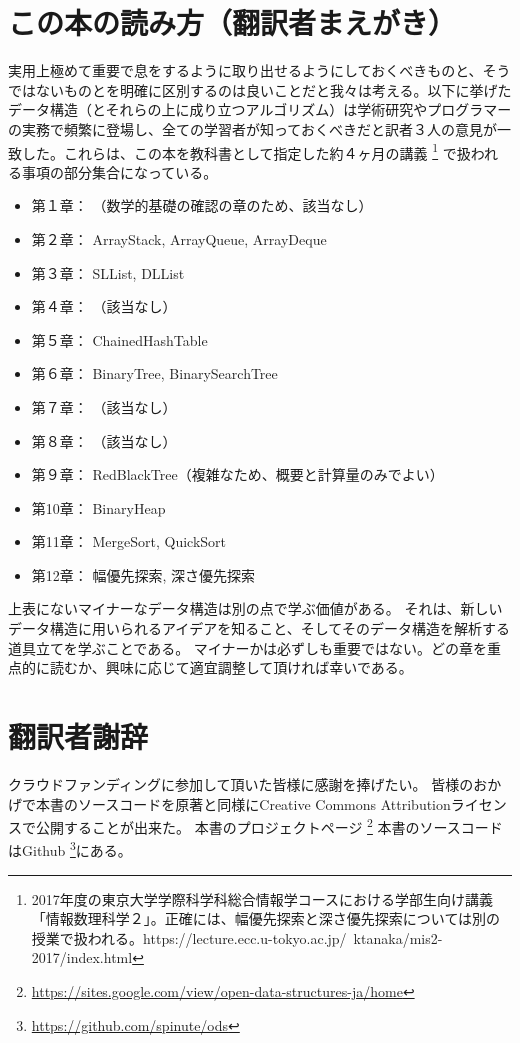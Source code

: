 \chapter*{この本の読み方（翻訳者まえがき）}

実用上極めて重要で息をするように取り出せるようにしておくべきものと、そうではないものとを明確に区別するのは良いことだと我々は考える。以下に挙げたデータ構造（とそれらの上に成り立つアルゴリズム）は学術研究やプログラマーの実務で頻繁に登場し、全ての学習者が知っておくべきだと訳者３人の意見が一致した。これらは、この本を教科書として指定した約４ヶ月の講義
\footnote{2017年度の東京大学学際科学科総合情報学コースにおける学部生向け講義「情報数理科学２」。正確には、幅優先探索と深さ優先探索については別の授業で扱われる。https://lecture.ecc.u-tokyo.ac.jp/~ktanaka/mis2-2017/index.html}
で扱われる事項の部分集合になっている。


\begin{itemize}
  \item 第１章： （数学的基礎の確認の章のため、該当なし）
  \item 第２章： ArrayStack, ArrayQueue, ArrayDeque
  \item 第３章： SLList, DLList
  \item 第４章： （該当なし）
  \item 第５章： ChainedHashTable
  \item 第６章： BinaryTree, BinarySearchTree
  \item 第７章： （該当なし）
  \item 第８章： （該当なし）
  \item 第９章： RedBlackTree（複雑なため、概要と計算量のみでよい）
  \item 第10章： BinaryHeap
  \item 第11章： MergeSort, QuickSort
  \item 第12章： 幅優先探索, 深さ優先探索
\end{itemize}

上表にないマイナーなデータ構造は別の点で学ぶ価値がある。
それは、新しいデータ構造に用いられるアイデアを知ること、そしてそのデータ構造を解析する道具立てを学ぶことである。
マイナーかは必ずしも重要ではない。どの章を重点的に読むか、興味に応じて適宜調整して頂ければ幸いである。


\chapter*{翻訳者謝辞}
クラウドファンディングに参加して頂いた皆様に感謝を捧げたい。
皆様のおかげで本書のソースコードを原著と同様にCreative Commons Attributionライセンスで公開することが出来た。
本書のプロジェクトページ \footnote {\url{https://sites.google.com/view/open-data-structures-ja/home}}
本書のソースコードはGithub \footnote {\url{https://github.com/spinute/ods}}にある。
